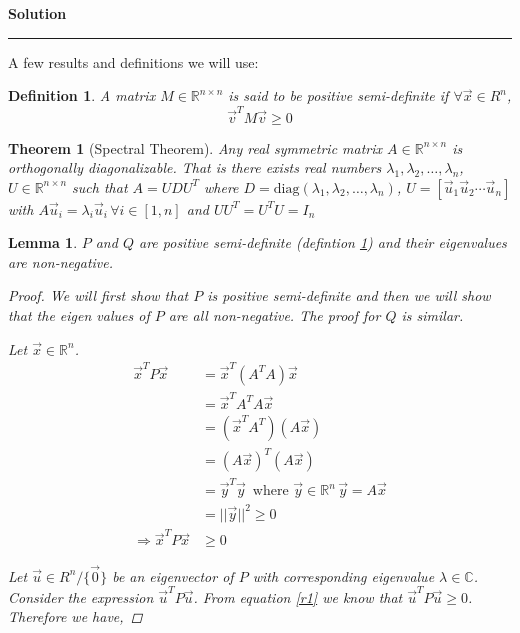 \documentclass[a4paper,12pt]{article}
\newenvironment{solution}[2][]{%
    \begin{mdframed}[linecolor=blue!70!black, linewidth=2pt, roundcorner=10pt, backgroundcolor=yellow!10!white, skipabove=12pt, skipbelow=12pt]%
        \textbf{\large #2}
        \par\noindent\rule{\textwidth}{0.4pt}
}{
    \end{mdframed}
}
\newtheorem{Def}{Definition}
\newtheorem{lemma}{Lemma}
\newtheorem{theorem}{Theorem}
\begin{document}
\begin{solution}{Solution}
      A few results and definitions we will use:
      \begin{Def}\label{psd}
         A matrix $M \in \mathbb{R}^{n \times n}$ is said to be positive semi-definite if $\forall \vec{x} \in R^{n}$,
         \[ \vec{v}^{T} M \vec{v} \geqslant 0\]
      \end{Def}
      \begin{theorem}[Spectral Theorem]\label{spectral}
        Any real symmetric matrix $A \in \mathbb{R}^{n \times n}$ is orthogonally diagonalizable. That is there exists real numbers
        $\lambda_{1},\lambda_{2}, \dots,\lambda_{n}$, $U \in \mathbb{R}^{n \times n}$ such that $A = UDU^{T}$ where 
        $D = \text{diag}(\lambda_{1},\lambda_{2},\dots,\lambda_{n})$,
        $U = \left[ \vec{u}_{1} \vec{u}_{2} \cdots \vec{u}_{n}\right]$ with 
        $A \vec{u}_{i} = \lambda_{i} \vec{u}_{i} \, \forall i \in [1,n]$ and $UU^{T} = U^{T}U = I_{n}$
      \end{theorem}
        \begin{lemma}\label{l1}
        $P$ and $Q$ are positive semi-definite (defintion \@\ref{psd}) and their eigenvalues are non-negative.
          \begin{proof}
            We will first show that $P$ is positive semi-definite and then we will show that the eigen values of $P$ 
            are all non-negative. The proof for $Q$ is similar.     
            
            Let $\vec{x} \in \mathbb{R}^{n}$. 
            \begin{align}
            \vec{x}^{T} P \vec{x} &= \vec{x}^{T}(A^{T}A) \vec{x} \nonumber \\ 
                                  &= \vec{x}^{T} A^{T} A \vec{x} \nonumber \\
                                  &= (\vec{x}^{T} A^{T}) (A \vec{x}) \nonumber \\
                                  &= {(A \vec{x})}^{T} (A\vec{x}) \nonumber \\
                                  &= \vec{y}^{T} \vec{y} \, \text{ where $\vec{y} \in \mathbb{R}^{n} \, \vec{y} = A \vec{x}$} \nonumber \\
                                  &= \lvert \lvert \vec{y} \rvert \rvert^{2} \geqslant 0 \nonumber \\
            \Rightarrow \label{r1}\vec{x}^{T} P \vec{x} &\geqslant 0
            \end{align}
            
            Let $\vec{u} \in R^{n}/\{\vec{0}\} $ be an eigenvector of $P$ with corresponding eigenvalue $\lambda \in \mathbb{C}$.
            Consider the expression $\vec{u}^{T} P \vec{u}$. From equation \@\ref{r1} we know that $\vec{u}^{T} P \vec{u} \geqslant 0$.
            Therefore we have,


\end{proof}
\end{lemma}
\end{solution}
\end{document}
